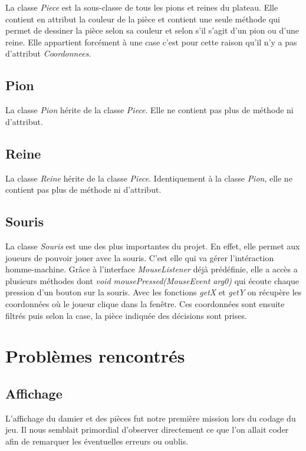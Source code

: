 \documentclass[12,french]{report}
\begin{document}
La classe \textit{Piece} est la sous-classe de tous les pions et reines du plateau. Elle contient en attribut la couleur de la pièce et contient une seule méthode qui permet de dessiner la pièce selon sa couleur et selon s'il s'agit d'un pion ou d'une reine. Elle appartient forcément à une case c'est pour cette raison qu'il n'y a pas d'attribut \textit{Coordonnees}.

\section{Pion}

La classe \textit{Pion} hérite de la classe \textit{Piece}. Elle ne contient pas plus de méthode ni d'attribut.

\section{Reine}

La classe \textit{Reine} hérite de la classe \textit{Piece}. Identiquement à la classe \textit{Pion}, elle ne contient pas plus de méthode ni d'attribut.
\section{Souris}

La classe \textit{Souris} est une des plus importantes du projet. En effet, elle permet aux joueurs de pouvoir jouer avec la souris. C'est elle qui va gérer l'intéraction homme-machine. Grâce à l'interface \textit{MouseListener} déjà prédéfinie, elle a accès a plusieurs méthodes dont \textit{void mousePressed(MouseEvent arg0)} qui écoute chaque pression d'un bouton sur la souris. Avec les fonctions \textit{getX} et \textit{getY} on récupère les coordonnées où le joueur clique dans la fenêtre. Ces coordonnées sont ensuite filtrés puis selon la case, la pièce indiquée des décisions sont prises.

\chapter{Problèmes rencontrés}

\section{Affichage}

L'affichage du damier et des pièces fut notre première mission lors du codage du jeu.
Il nous semblait primordial d'observer directement ce que l'on allait coder afin de remarquer les éventuelles erreurs ou oublis.\\
\end{document}
